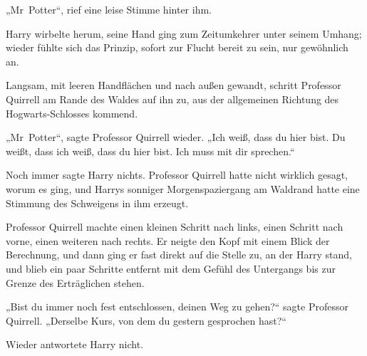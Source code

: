 „Mr~Potter“, rief eine leise Stimme hinter ihm.

Harry wirbelte herum, seine Hand ging zum Zeitumkehrer unter seinem Umhang; wieder fühlte sich das Prinzip, sofort zur Flucht bereit zu sein, nur gewöhnlich an.

Langsam, mit leeren Handflächen und nach außen gewandt, schritt Professor Quirrell am Rande des Waldes auf ihn zu, aus der allgemeinen Richtung des Hogwarts-Schlosses kommend.

„Mr~Potter“, sagte Professor Quirrell wieder. „Ich weiß, dass du hier bist. Du weißt, dass ich weiß, dass du hier bist. Ich muss mit dir sprechen.“

Noch immer sagte Harry nichts. Professor Quirrell hatte nicht wirklich gesagt, worum es ging, und Harrys sonniger Morgenspaziergang am Waldrand hatte eine Stimmung des Schweigens in ihm erzeugt.

Professor Quirrell machte einen kleinen Schritt nach links, einen Schritt nach vorne, einen weiteren nach rechts. Er neigte den Kopf mit einem Blick der Berechnung, und dann ging er fast direkt auf die Stelle zu, an der Harry stand, und blieb ein paar Schritte entfernt mit dem Gefühl des Untergangs bis zur Grenze des Erträglichen stehen.

„Bist du immer noch fest entschlossen, deinen Weg zu gehen?“ sagte Professor Quirrell. „Derselbe Kurs, von dem du gestern gesprochen hast?“

Wieder antwortete Harry nicht.

